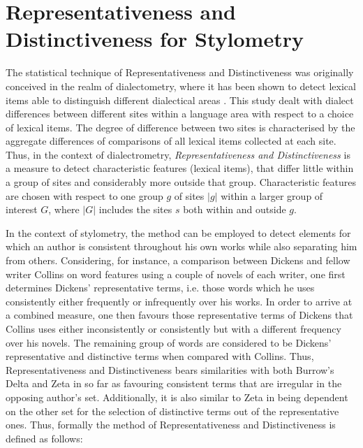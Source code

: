 \documentclass[a4paper,10pt,twoside,fleqn]{article}
\begin{document}
\section{Representativeness and Distinctiveness for Stylometry}
The statistical technique of Representativeness and Distinctiveness was 
originally conceived in the realm of dialectometry, where it has been
shown to detect lexical items able to distinguish different dialectical 
areas \cite{prokic2012detecting}.
This study dealt with dialect differences between different sites within 
a language area with respect to a choice of lexical items. 
The degree of difference between two sites is characterised by the aggregate 
differences of comparisons of all lexical items collected at 
each site. Thus, in the context of dialectrometry, 
\emph{Representativeness and Distinctiveness} is a measure to detect characteristic 
features (lexical items), that differ little within a group of sites 
and considerably more outside that group.
Characteristic features are chosen with respect to one group $g$ of sites 
$|g|$ within a larger group of interest $G$, where $|G|$ includes the sites 
$s$ both within and outside $g$.


In the context of stylometry, the method can be employed to detect elements for 
which an author is consistent throughout his own works while also separating him 
from others. Considering, for instance, a comparison between Dickens and fellow 
writer Collins on word features using a couple of novels of each writer, 
one first determines Dickens' representative terms, i.e. those words which he
uses consistently either frequently or infrequently over his works. 
In order to arrive at a combined measure, one then favours those representative 
terms of Dickens that Collins uses either inconsistently or consistently but with a
different frequency over his novels. The remaining group of words are considered 
to be Dickens' representative and distinctive terms when compared with Collins. 
Thus, Representativeness and Distinctiveness bears similarities with both 
Burrow's Delta \cite{Burrows2002delta} and Zeta  \cite{Burrows2007all} in so far as
favouring consistent terms that are irregular in the opposing author's set. 
Additionally, it is also similar to Zeta in being dependent on the other set 
for the selection of distinctive terms out of the representative ones. 
Thus, formally the method of Representativeness and Distinctiveness is defined 
as follows: \\
\end{document}
